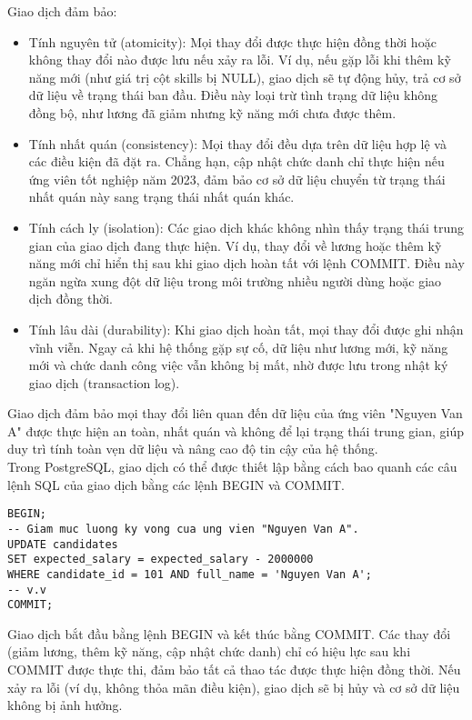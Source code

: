 Giao dịch đảm bảo:
\begin{itemize}
    \item Tính nguyên tử (atomicity): Mọi thay đổi được thực hiện đồng thời hoặc không thay đổi nào được lưu nếu xảy ra lỗi. Ví dụ, nếu gặp lỗi khi thêm kỹ năng mới (như giá trị cột skills bị NULL), giao dịch sẽ tự động hủy, trả cơ sở dữ liệu về trạng thái ban đầu. Điều này loại trừ tình trạng dữ liệu không đồng bộ, như lương đã giảm nhưng kỹ năng mới chưa được thêm.
    \item Tính nhất quán (consistency): Mọi thay đổi đều dựa trên dữ liệu hợp lệ và các điều kiện đã đặt ra. Chẳng hạn, cập nhật chức danh chỉ thực hiện nếu ứng viên tốt nghiệp năm 2023, đảm bảo cơ sở dữ liệu chuyển từ trạng thái nhất quán này sang trạng thái nhất quán khác.
    \item Tính cách ly (isolation): Các giao dịch khác không nhìn thấy trạng thái trung gian của giao dịch đang thực hiện. Ví dụ, thay đổi về lương hoặc thêm kỹ năng mới chỉ hiển thị sau khi giao dịch hoàn tất với lệnh COMMIT. Điều này ngăn ngừa xung đột dữ liệu trong môi trường nhiều người dùng hoặc giao dịch đồng thời.
    \item Tính lâu dài (durability): Khi giao dịch hoàn tất, mọi thay đổi được ghi nhận vĩnh viễn. Ngay cả khi hệ thống gặp sự cố, dữ liệu như lương mới, kỹ năng mới và chức danh công việc vẫn không bị mất, nhờ được lưu trong nhật ký giao dịch (transaction log).
\end{itemize}

Giao dịch đảm bảo mọi thay đổi liên quan đến dữ liệu của ứng viên "Nguyen Van A" được thực hiện an toàn, nhất quán và không để lại trạng thái trung gian, giúp duy trì tính toàn vẹn dữ liệu và nâng cao độ tin cậy của hệ thống.\\

Trong PostgreSQL, giao dịch có thể được thiết lập bằng cách bao quanh các câu lệnh SQL của giao dịch bằng các lệnh BEGIN và COMMIT.\\
\begin{lstlisting}
BEGIN;
-- Giam muc luong ky vong cua ung vien "Nguyen Van A".
UPDATE candidates 
SET expected_salary = expected_salary - 2000000
WHERE candidate_id = 101 AND full_name = 'Nguyen Van A';
-- v.v
COMMIT;
\end{lstlisting}

Giao dịch bắt đầu bằng lệnh BEGIN và kết thúc bằng COMMIT. Các thay đổi (giảm lương, thêm kỹ năng, cập nhật chức danh) chỉ có hiệu lực sau khi COMMIT được thực thi, đảm bảo tất cả thao tác được thực hiện đồng thời. Nếu xảy ra lỗi (ví dụ, không thỏa mãn điều kiện), giao dịch sẽ bị hủy và cơ sở dữ liệu không bị ảnh hưởng.\\

